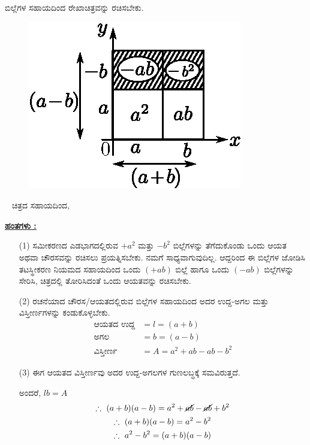 \begin{enumerate}
ಬಿಲ್ಲೆಗಳ ಸಹಾಯದಿಂದ ರೇಖಾಚಿತ್ರವನ್ನು ರಚಿಸಬೇಕು.
\begin{figure}[H]
\centering
\includegraphics[scale=0.8]{src/figure/chap3/fig3-32e.eps}
\end{figure}
~
\vskip -0.5cm
ಚಿತ್ರದ ಸಹಾಯದಿಂದ,

\noindent
{\textbf{\underline{ಹಂತಗಳು :}}}
\begin{itemize}
\item[(1)] ಸಮೀಕರಣದ ಎಡಭಾಗದಲ್ಲಿರುವ $+a^2$ ಮತ್ತು $-b^2$ ಬಿಲ್ಲೆಗಳನ್ನು ತೆಗೆದುಕೊಂಡು ಒಂದು ಆಯತ ಅಥವಾ ಚೌರಸವನ್ನು ರಚಿಸಲು ಪ್ರಯತ್ನಿಸಬೇಕು. ನಮಗೆ ಸಾಧ್ಯವಾಗುವುದಿಲ್ಲ. ಆದ್ದರಿಂದ ಈ ಬಿಲ್ಲೆಗಳ ಜೋಡಿಸಿ ತಟಸ್ಥೀಕರಣ ನಿಯಮದ ಸಹಾಯದಿಂದ ಒಂದು $(+ab)$ ಬಿಲ್ಲೆ ಹಾಗೂ ಒಂದು $(-ab)$ ಬಿಲ್ಲೆಗಳನ್ನು ಸೇರಿಸಿ, ಚಿತ್ರದಲ್ಲಿ ತೋರಿಸಿದಂತೆ ಒಂದು ಆಯತವನ್ನು ರಚಿಸಬೇಕು. 
\item[(2)] ರಚನೆಯಾದ ಚೌರಸ/ಆಯತದಲ್ಲಿರುವ ಬಿಲ್ಲೆಗಳ ಸಹಾಯದಿಂದ ಅದರ ಉದ್ದ-ಅಗಲ ಮತ್ತು ವಿಸ್ತೀರ್ಣಗಳನ್ನು ಕಂಡುಕೊಳ್ಳಬೇಕು.
\begin{align*}
\text{ಆಯತದ ಉದ್ದ}& = l = (a+b)\\
\text{ಅಗಲ} & = b = (a-b)\\
\text{ವಿಸ್ತೀರ್ಣ} & = A = a^2 + ab - ab - b^2
\end{align*}

\item[(3)] ಈಗ ಆಯತದ ವಿಸ್ತೀರ್ಣವು ಅದರ ಉದ್ದ-ಅಗಲಗಳ ಗುಣಲಬ್ಧಕ್ಕೆ ಸಮ\-ವಿರುತ್ತದೆ.

ಅಂದರೆ, $lb = A$
\begin{gather*}
\therefore~ (a+b)(a-b) = a^2 + \cancel{ab} - \cancel{ab} + b^2\\
\therefore~ (a+b)(a-b) = a^2 - b^2\\
\therefore~ a^2 - b^2 = (a+b)(a-b)
\end{gather*}
\end{itemize}



\end{enumerate}
